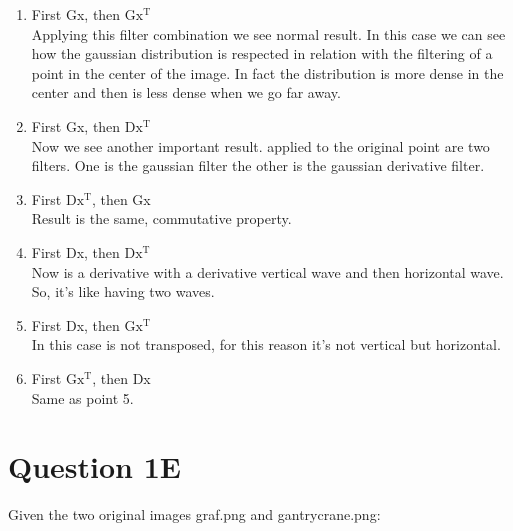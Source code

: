 \documentclass[
	12pt, %
]{fphw}
\begin{document}
\begin{enumerate} 
 \item First Gx, then $\mathrm{Gx^{T}}$
		 \\ Applying this filter combination we see normal result. In this case we can see how the gaussian distribution is respected in relation with the filtering of a point in the center of the image. In fact the distribution is more dense in the center and then is less dense when we go far away.
 \item First Gx, then $\mathrm{Dx^{T}}$
		\\Now we see another important result. applied to the original point are two filters. One is the gaussian filter the other is the gaussian derivative filter. 
 \item First $\mathrm{Dx^{T}}$, then Gx
		\\ Result is the same, commutative property.
 \item First Dx, then $\mathrm{Dx^{T}}$
		\\ Now is a derivative with a derivative vertical wave and then horizontal wave. So, it's like having two waves.
 \item First Dx, then $\mathrm{Gx^{T}}$
		\\ In this case is not transposed, for this reason it's not vertical but horizontal.
 \item First $\mathrm{Gx^{T}}$, then Dx
		\\ Same as point  5.
 \end{enumerate}


\section { Question 1E}

Given the two original images graf.png and gantrycrane.png:
\end{document}
